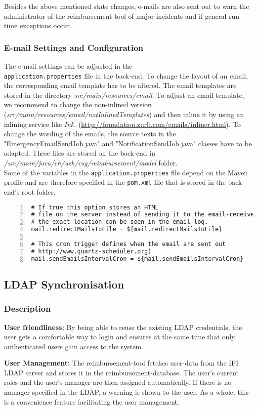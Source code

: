 Besides the above mentioned state changes, e-mails are also sent out to warn the administrator of the reimbursement-tool of major incidents and if general run-time exceptions occur.

\subsubsection{E-mail Settings and Configuration}
\label{subsubsec:e-mail}

The e-mail settings can be adjusted in the \\ \texttt{application.properties} file in the back-end. To change the layout of an email, the corresponding email template has to be altered. The email templates are stored in the directory \textit{src/main/resources/email}. To adjust an email template, we recommend to change the non-inlined version (\textit{src/main/resources/email/notInlinedTemplates}) and then inline it by using an inlining service like \textit{Ink.} (\url{http://foundation.zurb.com/emails/inliner.html}). To change the wording of the emails, the source texts in the "EmergencyEmailSendJob.java" and "NotificationSendJob.java" classes have to be adapted. These files are stored on the back-end in \textit{/src/main/java/ch/uzh/csg/reimbursement/model} folder. \newline \\
Some of the variables in the \texttt{application.properties} file depend on the Maven profile and are therefore specified in the \texttt{pom.xml} file that is stored in the back-end's root folder.

\begin{lstlisting}[numbers=left, breaklines=true]
# If true this option stores an HTML
# file on the server instead of sending it to the email-receiver.
# the exact location can be seen in the email-log.
mail.redirectMailsToFile = ${mail.redirectMailsToFile}

# This cron trigger defines when the email are sent out
# http://www.quartz-scheduler.org)
mail.sendEmailsIntervalCron = ${mail.sendEmailsIntervalCron}
\end{lstlisting}


\subsection{LDAP Synchronisation}
\subsubsection{Description}
\label{feature:ldap}
\textbf{User friendliness: }By being able to reuse the existing LDAP credentials, the user gets a comfortable way to login and ensures at the same time that only authenticated users gain access to the system.\par 
\textbf{User Management: }The reimbursement-tool fetches user-data from the IFI LDAP server and stores it in the reimbursement-database. The user's current roles and the user's manager are then assigned automatically.  If there is no manager specified in the LDAP, a warning is shown to the user. As a whole, this is a convenience feature facilitating the user management.

